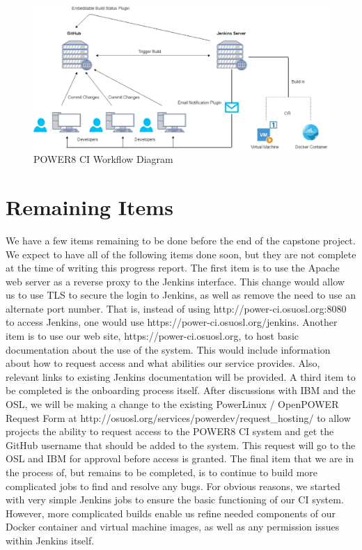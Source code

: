 \documentclass[10pt,onecolumn,journal,draftclsnofoot]{IEEEtran}
\begin{document}
\begin{figure}[H] 
  \includegraphics[width=\textwidth]{images/workflow.eps}
  \caption{POWER8 CI Workflow Diagram}
\end{figure}

\clearpage
\section{Remaining Items}
We have a few items remaining to be done before the end of the capstone project.
We expect to have all of the following items done soon, but they are not complete at the time of writing this progress report.
The first item is to use the Apache web server as a reverse proxy to the Jenkins interface.
This change would allow us to use TLS to secure the login to Jenkins, as well as remove the need to use an alternate port number. 
That is, instead of using http://power-ci.osuosl.org:8080 to access Jenkins, one would use https://power-ci.osuosl.org/jenkins. 
Another item is to use our web site, https://power-ci.osuosl.org, to host basic documentation about the use of the system.
This would include information about how to request access and what abilities our service provides.
Also, relevant links to existing Jenkins documentation will be provided. 
A third item to be completed is the onboarding process itself. 
After discussions with IBM and the OSL, we will be making a change to the existing PowerLinux / OpenPOWER Request Form at http://osuosl.org/services/powerdev/request\_hosting/ to allow projects the ability to request access to the POWER8 CI system and get the GitHub username that should be added to the system. 
This request will go to the OSL and IBM for approval before access is granted.
The final item that we are in the process of, but remains to be completed, is to continue to build more complicated jobs to find and resolve any bugs.
For obvious reasons, we started with very simple Jenkins jobs to ensure the basic functioning of our CI system.
However, more complicated builds enable us refine needed components of our Docker container and virtual machine images, as well as any permission issues within Jenkins itself.
\end{document}
